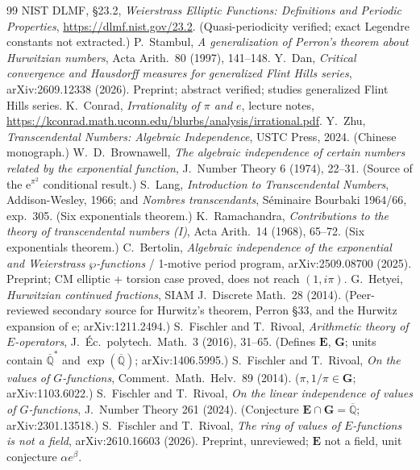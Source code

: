 \documentclass[11pt]{amsart}
\theoremstyle{definition}
\theoremstyle{remark}
\numberwithin{equation}{section}
\newcommand{\Q}{\mathbb{Q}}
\newcommand{\ee}{\mathrm{e}}
\begin{document}
\begin{thebibliography}{99}
 NIST DLMF, \S23.2, \emph{Weierstrass Elliptic Functions: Definitions and Periodic Properties}, \url{https://dlmf.nist.gov/23.2}. (Quasi-periodicity verified; exact Legendre constants not extracted.)
 P.~Stambul, \emph{A generalization of Perron's theorem about Hurwitzian numbers}, Acta Arith.~80 (1997), 141--148.
 Y.~Dan, \emph{Critical convergence and Hausdorff measures for generalized Flint Hills series}, arXiv:2609.12338 (2026). Preprint; abstract verified; studies generalized Flint Hills series.
 K.~Conrad, \emph{Irrationality of $\pi$ and $e$}, lecture notes, \url{https://kconrad.math.uconn.edu/blurbs/analysis/irrational.pdf}.
 Y.~Zhu, \emph{Transcendental Numbers: Algebraic Independence}, USTC Press, 2024. (Chinese monograph.)
 W.~D.~Brownawell, \emph{The algebraic independence of certain numbers related by the exponential function}, J.~Number Theory 6 (1974), 22--31. (Source of the $\ee^{\pi^2}$ conditional result.)
 S.~Lang, \emph{Introduction to Transcendental Numbers}, Addison-Wesley, 1966; and \emph{Nombres transcendants}, S\'eminaire Bourbaki 1964/66, exp.~305. (Six exponentials theorem.)
 K.~Ramachandra, \emph{Contributions to the theory of transcendental numbers (I)}, Acta Arith.~14 (1968), 65--72. (Six exponentials theorem.)
 C.~Bertolin, \emph{Algebraic independence of the exponential and Weierstrass $\wp$-functions} / 1-motive period program, arXiv:2509.08700 (2025). Preprint; CM elliptic + torsion case proved, does not reach $(1,i\pi)$.
 G.~Hetyei, \emph{Hurwitzian continued fractions}, SIAM J.~Discrete Math.~28 (2014). (Peer-reviewed secondary source for Hurwitz's theorem, Perron \S33, and the Hurwitz expansion of $\ee$; arXiv:1211.2494.)
 S.~Fischler and T.~Rivoal, \emph{Arithmetic theory of $E$-operators}, J.~\'Ec.~polytech.~Math.~3 (2016), 31--65. (Defines $\mathbf{E}$, $\mathbf{G}$; units contain $\overline{\Q}^*$ and $\exp(\overline{\Q})$; arXiv:1406.5995.)
 S.~Fischler and T.~Rivoal, \emph{On the values of $G$-functions}, Comment.~Math.~Helv.~89 (2014). ($\pi,1/\pi\in\mathbf{G}$; arXiv:1103.6022.)
 S.~Fischler and T.~Rivoal, \emph{On the linear independence of values of $G$-functions}, J.~Number Theory 261 (2024). (Conjecture $\mathbf{E}\cap\mathbf{G}=\overline{\Q}$; arXiv:2301.13518.)
 S.~Fischler and T.~Rivoal, \emph{The ring of values of $E$-functions is not a field}, arXiv:2610.16603 (2026). Preprint, unreviewed; $\mathbf{E}$ not a field, unit conjecture $\alpha e^\beta$.

\end{thebibliography}
\end{document}
